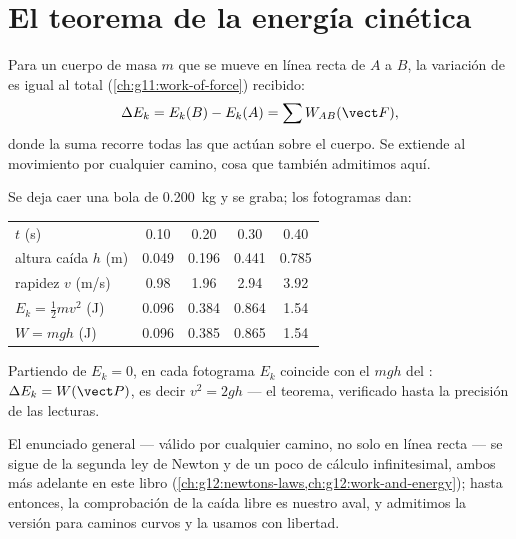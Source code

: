 \section{El teorema de la energía cinética}

\begin{theorem}\label{thm:g11:mechanical-energy:ketheorem}
Para un cuerpo de masa $m$ que se mueve en línea recta de $A$ a $B$, la
variación de  es igual al  total
(\cref{ch:g11:work-of-force}) recibido:
\[
\Delta E_k = E_k(B) - E_k(A) = \sum W_{AB}(\vect F),
\]
donde la suma recorre todas las  que actúan sobre el cuerpo. Se
extiende al movimiento por cualquier camino, cosa que también admitimos
aquí.
\end{theorem}
\admitted

\begin{example}\label{ex:g11:mechanical-energy:freefall}
Se deja caer una bola de \qty{0.200}{kg} y se graba; los fotogramas dan:
\begin{center}\small
\begin{tabular}{lcccc}
$t$ (\unit{s}) & 0.10 & 0.20 & 0.30 & 0.40\\
altura caída $h$ (\unit{m}) & 0.049 & 0.196 & 0.441 & 0.785\\
rapidez $v$ (\unit{m/s}) & 0.98 & 1.96 & 2.94 & 3.92\\
$E_k = \tfrac12 mv^2$ (\unit{J}) & 0.096 & 0.384 & 0.864 & 1.54\\
$W = mgh$ (\unit{J}) & 0.096 & 0.385 & 0.865 & 1.54
\end{tabular}
\end{center}
Partiendo de $E_k = 0$, en cada fotograma $E_k$ coincide con el 
$mgh$ del : $\Delta E_k = W(\vect P)$, es decir $v^2 = 2gh$ --- el
teorema, verificado hasta la precisión de las lecturas.
\end{example}

\begin{remark}\label{rem:g11:mechanical-energy:proof}
El enunciado general --- válido por cualquier camino, no solo en línea
recta --- se sigue de la segunda ley de Newton y de un poco de cálculo
infinitesimal, ambos más adelante en este libro
(\cref{ch:g12:newtons-laws,ch:g12:work-and-energy}); hasta entonces, la
comprobación de la caída libre es nuestro aval, y admitimos la versión
para caminos curvos y la usamos con libertad.
\end{remark}

